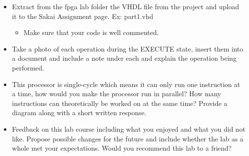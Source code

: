 \begin{itemize}

	\item Extract from the fpga lab folder the VHDL file from the project and upload it to the Sakai Assignment page. Ex: part1.vhd

	\begin{itemize}

		\item Make sure that your code is well commented.

	\end{itemize}

	\item Take a photo of each operation during the EXECUTE state, insert them into a document and include a note under each and explain the operation being performed.

	\item This processor is single-cycle which means it can only run one instruction at a time, how would you make the processor run in parallel? How many instructions can theoretically be worked on at the same time? Provide a diagram along with a short written response.

	\item Feedback on this lab course including what you enjoyed and what you did not like. Propose possible changes for the future and include whether the lab as a whole met your expectations. Would you recommend this lab to a friend?
\end{itemize}